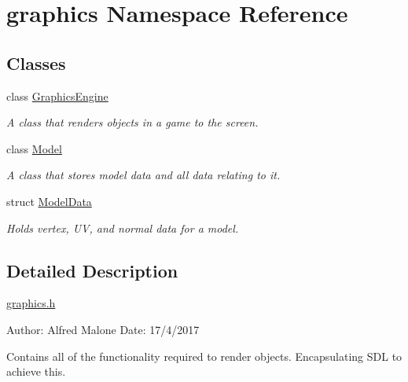 \hypertarget{namespacegraphics}{}\section{graphics Namespace Reference}
\label{namespacegraphics}
\subsection*{Classes}
\begin{DoxyCompactItemize}
\item 
class \hyperlink{classgraphics_1_1_graphics_engine}{Graphics\+Engine}
\begin{DoxyCompactList}\small\item\em A class that renders objects in a game to the screen. \end{DoxyCompactList}\item 
class \hyperlink{classgraphics_1_1_model}{Model}
\begin{DoxyCompactList}\small\item\em A class that stores model data and all data relating to it. \end{DoxyCompactList}\item 
struct \hyperlink{structgraphics_1_1_model_data}{Model\+Data}
\begin{DoxyCompactList}\small\item\em Holds vertex, U\+V, and normal data for a model. \end{DoxyCompactList}\end{DoxyCompactItemize}


\subsection{Detailed Description}
\hyperlink{graphics_8h}{graphics.\+h}

Author\+: Alfred Malone Date\+: 17/4/2017

Contains all of the functionality required to render objects. Encapsulating S\+D\+L to achieve this. 